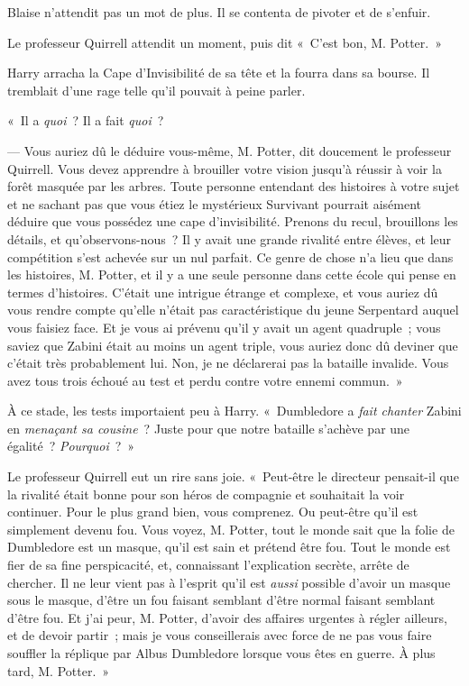 Blaise n'attendit pas un mot de plus. Il se contenta de pivoter et de s'enfuir.

\later

Le professeur Quirrell attendit un moment, puis dit «~C'est bon, M. Potter.~»

Harry arracha la Cape d'Invisibilité de sa tête et la fourra dans sa bourse. Il tremblait d'une rage telle qu'il pouvait à peine parler.

«~Il a \emph{quoi}~? Il a fait \emph{quoi}~?

--- Vous auriez dû le déduire vous-même, M. Potter, dit doucement le professeur Quirrell. Vous devez apprendre à brouiller votre vision jusqu'à réussir à voir la forêt masquée par les arbres. Toute personne entendant des histoires à votre sujet et ne sachant pas que vous étiez le mystérieux Survivant pourrait aisément déduire que vous possédez une cape d'invisibilité. Prenons du recul, brouillons les détails, et qu'observons-nous~? Il y avait une grande rivalité entre élèves, et leur compétition s'est achevée sur un nul parfait. Ce genre de chose n'a lieu que dans les histoires, M. Potter, et il y a une seule personne dans cette école qui pense en termes d'histoires. C'était une intrigue étrange et complexe, et vous auriez dû vous rendre compte qu'elle n'était pas caractéristique du jeune Serpentard auquel vous faisiez face. Et je vous ai prévenu qu'il y avait un agent quadruple~; vous saviez que Zabini était au moins un agent triple, vous auriez donc dû deviner que c'était très probablement lui. Non, je ne déclarerai pas la bataille invalide. Vous avez tous trois échoué au test et perdu contre votre ennemi commun.~»

À ce stade, les tests importaient peu à Harry. «~Dumbledore a \emph{fait chanter} Zabini en \emph{menaçant sa cousine}~? Juste pour que notre bataille s'achève par une égalité~? \emph{Pourquoi}~?~»

Le professeur Quirrell eut un rire sans joie. «~Peut-être le directeur pensait-il que la rivalité était bonne pour son héros de compagnie et souhaitait la voir continuer. Pour le plus grand bien, vous comprenez. Ou peut-être qu'il est simplement devenu fou. Vous voyez, M. Potter, tout le monde sait que la folie de Dumbledore est un masque, qu'il est sain et prétend être fou. Tout le monde est fier de sa fine perspicacité, et, connaissant l'explication secrète, arrête de chercher. Il ne leur vient pas à l'esprit qu'il est \emph{aussi} possible d'avoir un masque sous le masque, d'être un fou faisant semblant d'être normal faisant semblant d'être fou. Et j'ai peur, M. Potter, d'avoir des affaires urgentes à régler ailleurs, et de devoir partir~; mais je vous conseillerais avec force de ne pas vous faire souffler la réplique par Albus Dumbledore lorsque vous êtes en guerre. À plus tard, M. Potter.~»

